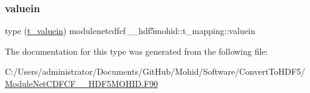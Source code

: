 \mbox{\label{structmodulenetcdfcf__2__hdf5mohid_1_1t__mapping_ad10f2fa0bb53efa8ec4fbdc961d0631e}} 
\subsubsection{\texorpdfstring{valuein}{valuein}}
{\footnotesize\ttfamily type (\mbox{\hyperlink{structmodulenetcdfcf__2__hdf5mohid_1_1t__valuein}{t\+\_\+valuein}}) modulenetcdfcf\+\_\+\_\+hdf5mohid\+::t\+\_\+mapping\+::valuein\hspace{0.3cm}{\ttfamily [private]}}



The documentation for this type was generated from the following file\+:\begin{DoxyCompactItemize}
\item 
C\+:/\+Users/administrator/\+Documents/\+Git\+Hub/\+Mohid/\+Software/\+Convert\+To\+H\+D\+F5/\mbox{\hyperlink{_module_net_c_d_f_c_f__2___h_d_f5_m_o_h_i_d_8_f90}{Module\+Net\+C\+D\+F\+C\+F\+\_\+\_\+\+H\+D\+F5\+M\+O\+H\+I\+D.\+F90}}\end{DoxyCompactItemize}
